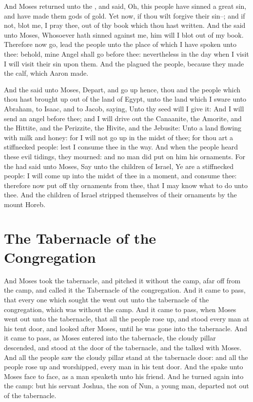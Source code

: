 \begin{biblechapter}
\verse And Moses returned unto the \LORD, and said, Oh, this people have sinned a great sin, and have made them gods of gold.
\verse Yet now, if thou wilt forgive their sin--; and if not, blot me, I pray thee, out of thy book which thou hast written.
\verse And the \LORD said unto Moses, Whosoever hath sinned against me, him will I blot out of my book.
\verse Therefore now go, lead the people unto the place of which I have spoken unto thee: behold, mine Angel shall go before thee: nevertheless in the day when I visit I will visit their sin upon them.
\verse And the \LORD plagued the people, because they made the calf, which Aaron made.
\end{biblechapter}

\begin{biblechapter} %
\verse And the \LORD said unto Moses, Depart, and go up hence, thou and the people which thou hast brought up out of the land of Egypt, unto the land which I sware unto Abraham, to Isaac, and to Jacob, saying, Unto thy seed will I give it:
\verse And I will send an angel before thee; and I will drive out the Canaanite, the Amorite, and the Hittite, and the Perizzite, the Hivite, and the Jebusite:
\verse Unto a land flowing with milk and honey: for I will not go up in the midst of thee; for thou art a stiffnecked people: lest I consume thee in the way.
\verse And when the people heard these evil tidings, they mourned: and no man did put on him his ornaments.
\verse For the \LORD had said unto Moses, Say unto the children of Israel, Ye are a stiffnecked people: I will come up into the midst of thee in a moment, and consume thee: therefore now put off thy ornaments from thee, that I may know what to do unto thee.
\verse And the children of Israel stripped themselves of their ornaments by the mount Horeb.
\section*{The Tabernacle of the Congregation}
\verse And Moses took the tabernacle, and pitched it without the camp, afar off from the camp, and called it the Tabernacle of the congregation. And it came to pass, that every one which sought the \LORD went out unto the tabernacle of the congregation, which was without the camp.
\verse And it came to pass, when Moses went out unto the tabernacle, that all the people rose up, and stood every man at his tent door, and looked after Moses, until he was gone into the tabernacle.
\verse And it came to pass, as Moses entered into the tabernacle, the cloudy pillar descended, and stood at the door of the tabernacle, and the \LORD talked with Moses.
\verse And all the people saw the cloudy pillar stand at the tabernacle door: and all the people rose up and worshipped, every man in his tent door.
\verse And the \LORD spake unto Moses face to face, as a man speaketh unto his friend. And he turned again into the camp: but his servant Joshua, the son of Nun, a young man, departed not out of the tabernacle.

\end{biblechapter}
